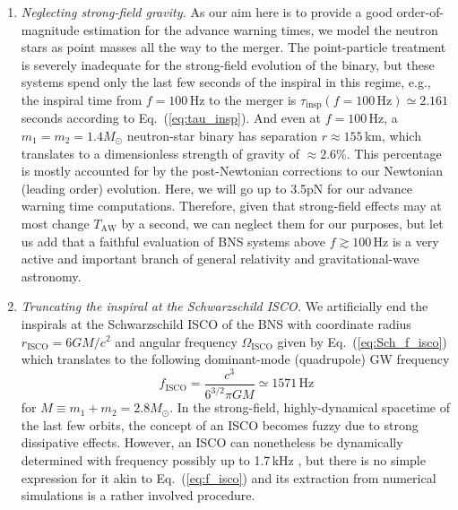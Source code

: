 \documentclass[prd,amsmath,amssymb,aps,floats,amsfonts,notitlepage,superscriptaddress,eqsecnum,nofootinbib,10pt]{revtex4-1}
\newcommand{\f}{\frac}
\newcommand{\be}{\begin{equation}}
\newcommand{\ee}{\end{equation}}
\begin{document}
\begin{enumerate}
 \item {\it Neglecting strong-field gravity.}
As our aim here is to provide a good order-of-magnitude estimation for the advance warning times, we model the neutron stars as point masses %
all the way to the merger. The point-particle treatment is severely inadequate for the strong-field evolution of the binary, but these systems spend only the last few seconds of the inspiral in this regime, e.g., the inspiral time from $f=100\,$Hz to the merger is
$\tau_\text{insp}(f=100\,\text{Hz})\simeq 2.161\,$seconds according to Eq.~(\ref{eq:tau_insp}).
And even at $f=100\,$Hz, a $m_1=m_2=1.4M_\odot$ neutron-star binary has separation $r\approx 155\,$km, which translates to a dimensionless strength of gravity of $\approx 2.6\%$.
This percentage is mostly accounted for by the post-Newtonian
corrections to our Newtonian (leading order) evolution. 
Here, we will go up to 3.5pN for our
advance warning time computations.
Therefore, given that strong-field effects may at most change
$T_\text{AW}$ by a second, we can neglect them for our purposes,
but let us add that a faithful evaluation of BNS systems above $f\gtrsim 100\,$Hz is a very active and important branch of general relativity and gravitational-wave astronomy. %
%
\item {\it Truncating the inspiral at the Schwarzschild ISCO.}
We artificially end the inspirals at the Schwarzschild ISCO of the BNS with coordinate radius $r_\text{ISCO} = 6GM/c^2$ and angular frequency $\Omega_\text{ISCO}$ %
given by Eq.~(\ref{eq:Sch_f_isco}) which translates to the following dominant-mode (quadrupole) GW frequency
\be
f_\text{ISCO} = \f{c^3}{6^{3/2}\pi G M} \simeq 1571\,\text{Hz} \label{eq:f_isco}
\ee
for $M \equiv m_1+m_2 = 2.8 M_\odot$. In the strong-field, highly-dynamical spacetime of the last few orbits, the
concept of an ISCO becomes fuzzy due to strong dissipative effects. However, an ISCO can nonetheless be dynamically determined
with frequency possibly up to 1.7\,kHz \cite{Marronetti:2003hx}, 
but there is no simple expression for it akin to Eq.~(\ref{eq:f_isco}) and its extraction from numerical simulations is a rather involved procedure.

\end{enumerate}
\end{document}
